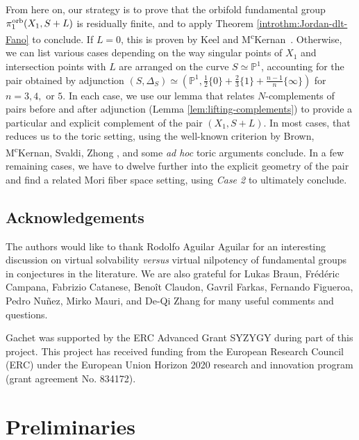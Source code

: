 \documentclass{amsart}
\theoremstyle{definition}
\theoremstyle{remark}
\numberwithin{equation}{section}
\begin{document}
\begin{minipage}{0.9\textwidth}
\medskip

From here on, our strategy is to prove that the orbifold fundamental group $\pi_1^{\rm orb}(X_1,S+L)$ is residually finite, and to apply Theorem \ref{introthm:Jordan-dlt-Fano} to conclude. If $L=0$, this is proven by Keel and M\textsuperscript{c}Kernan~\cite[Theorem 1.4]{KM92}. Otherwise, we can list various cases depending on the way singular points of $X_1$ and intersection points with $L$ are arranged on the curve $S\simeq\mathbb{P}^1$, accounting for the pair obtained by adjunction $(S,\Delta_S)\simeq\left(\mathbb{P}^1,\frac{1}{2}\{0\}+\frac{2}{3}\{1\}+\frac{n-1}{n}\{\infty\}\right)$ for $n=3,4,$ or $5$. In each case, we use our lemma that relates $N$-complements of pairs before and after adjunction (Lemma \ref{lem:lifting-complements}) to provide a particular and explicit complement of the pair $(X_1,S+L)$. In most cases, that reduces us to the toric setting, using the well-known criterion by Brown, M\textsuperscript{c}Kernan, Svaldi, Zhong \cite{BMSZ18}, and some {\it ad hoc} toric arguments conclude. In a few remaining cases, we have to dwelve further into the explicit geometry of the pair and find a related Mori fiber space setting, using {\it Case 2} to ultimately conclude.
\end{minipage}



\subsection*{Acknowledgements}
The authors would like to thank 
Rodolfo Aguilar Aguilar for an interesting discussion on virtual solvability {\it versus} virtual nilpotency of fundamental groups in conjectures in the literature. We are also grateful for
Lukas Braun, 
Fr\'ed\'eric Campana,
Fabrizio Catanese,
Beno\^it Claudon, 
Gavril Farkas,
Fernando Figueroa,
Pedro Nu\~nez,
Mirko Mauri,
and De-Qi Zhang
for many useful comments and questions.

Gachet was supported by the ERC Advanced Grant SYZYGY during part of this project. This project has received funding from the European Research Council (ERC) under the European Union Horizon 2020 research and innovation program (grant agreement No. 834172).



\section{Preliminaries}
\end{document}
